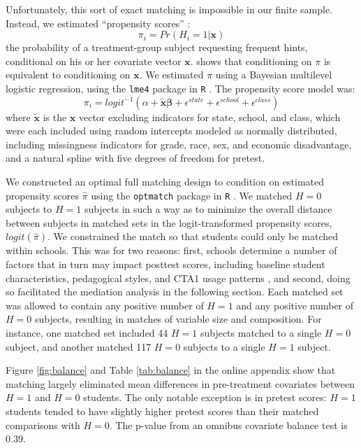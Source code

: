 \documentclass{article}\usepackage[]{graphicx}\usepackage[]{color}
\begin{document}
Unfortunately, this sort of exact matching is impossible in our finite
sample.
Instead, we estimated ``propensity scores'' \citep{rosenbaum1983central}:
\begin{equation*}
\pi_i=Pr(H_i=1|\bm{x})
\end{equation*}
the probability of a treatment-group subject requesting frequent hints, conditional on
his or her covariate vector $\bm{x}$.
\citet{rosenbaum1983central} shows that conditioning on $\pi$ is
equivalent to conditioning on $\bm{x}$.
We estimated $\pi$ using a Bayesian multilevel logistic regression,
using the \texttt{lme4} package in
\texttt{R} \citep{lme4}.
The propensity score model was:
\begin{equation*}
\pi_i=logit^{-1}(\alpha+\bm{\tilde{x}}\bm{\beta}+\epsilon^{state}+\epsilon^{school}+\epsilon^{class})
\end{equation*}
where $\bm{\tilde{x}}$ is the $\bm{x}$ vector excluding indicators for
state, school, and class, which were each included using random
intercepts modeled as normally distributed, including missingness
indicators for grade, race, sex, and economic disadvantage, and
a natural spline with five degrees of freedom for pretest.

We constructed an optimal full matching design \citep{hansen2004} to
condition on estimated propensity scores $\hat{\pi}$ using the
\texttt{optmatch} package in \texttt{R} \citep{optmatch}.
We matched $H=0$ subjects to $H=1$ subjects in such a way as
to minimize the overall distance between subjects in matched sets in
the logit-transformed propensity scores, $logit(\hat{\pi})$.
We constrained the match so that students could only be matched within
schools.
This was for two reasons: first, schools determine a number of factors
that in turn may impact posttest scores, including baseline
student characteristics, pedagogical styles, and CTA1 usage patterns
\citep[see][]{descriptivePaper}, and second, doing so facilitated the mediation
analysis in the following section.
Each matched set was allowed to contain any positive number of $H=1$
and any positive number of $H=0$ subjects, resulting in matches of
variable size and composition.
For instance, one matched set included 44 $H=1$ subjects matched to a
single $H=0$ subject, and another matched 117 $H=0$ subjects to a
single $H=1$ subject.

Figure \ref{fig:balance} and Table \ref{tab:balance} in the online appendix show that
matching largely eliminated mean differences in pre-treatment
covariates between $H=1$ and $H=0$ students.
The only notable exception is in pretest scores: $H=1$ students tended
to have slightly higher pretest scores than their matched comparisons
with $H=0$.
The p-value from an omnibus covariate balance test
\citep{covBal} is 0.39.
\end{document}
